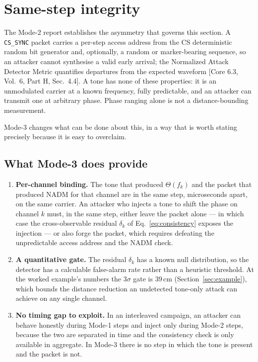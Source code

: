 \documentclass[11pt,a4paper]{article}
\newcommand{\NADM}{\mathrm{NADM}}
\newcommand{\code}[1]{\texttt{\small #1}}
\newcommand{\core}[1]{\textcolor{rulegrey}{\small[Core 6.3, #1]}}
\begin{document}
\section{Same-step integrity}
\label{sec:security}

The Mode-2 report establishes the asymmetry that governs this section. A \code{CS\_SYNC} packet
carries a per-step access address from the CS deterministic random bit generator and, optionally, a
random or marker-bearing sequence, so an attacker cannot synthesise a valid early arrival; the
Normalized Attack Detector Metric quantifies departures from the expected waveform
\core{Vol.\ 6, Part H, Sec.\ 4.4}. A tone has none of these properties: it is an unmodulated carrier
at a known frequency, fully predictable, and an attacker can transmit one at arbitrary phase. Phase
ranging alone is not a distance-bounding measurement.

Mode-3 changes what can be done about this, in a way that is worth stating precisely because it is
easy to overclaim.

\subsection{What Mode-3 does provide}

\begin{enumerate}[leftmargin=1.6em,itemsep=2pt]
  \item \textbf{Per-channel binding.} The tone that produced $\Theta(f_k)$ and the packet that
    produced $\NADM$ for that channel are in the same step, microseconds apart, on the same carrier.
    An attacker who injects a tone to shift the phase on channel $k$ must, in the same step, either
    leave the packet alone --- in which case the cross-observable residual $\delta_k$ of
    Eq.~\eqref{eq:consistency} exposes the injection --- or also forge the packet, which requires
    defeating the unpredictable access address and the $\NADM$ check.
  \item \textbf{A quantitative gate.} The residual $\delta_k$ has a known null distribution, so the
    detector has a calculable false-alarm rate rather than a heuristic threshold. At the worked
    example's numbers the $3\sigma$ gate is $39$\,cm (Section~\ref{sec:example}), which bounds the
    distance reduction an undetected tone-only attack can achieve on any single channel.
  \item \textbf{No timing gap to exploit.} In an interleaved campaign, an attacker can behave
    honestly during Mode-1 steps and inject only during Mode-2 steps, because the two are separated
    in time and the consistency check is only available in aggregate. In Mode-3 there is no step in
    which the tone is present and the packet is not.
\end{enumerate}
\end{document}
